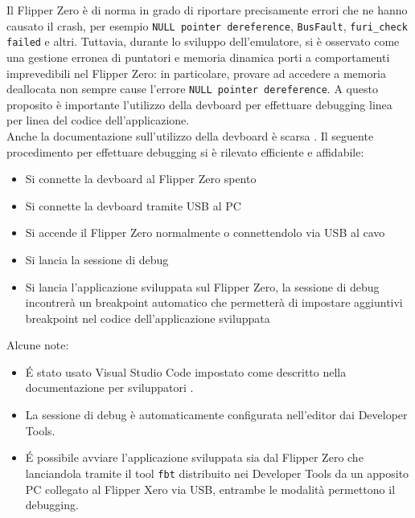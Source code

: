Il Flipper Zero è di norma in grado di riportare precisamente errori che ne hanno causato il crash, per esempio \texttt{NULL pointer dereference}, \texttt{BusFault}, \texttt{furi\_check failed} e altri. Tuttavia, durante lo sviluppo dell'emulatore, si è osservato come una gestione erronea di puntatori e memoria dinamica porti a comportamenti imprevedibili nel Flipper Zero: in particolare, provare ad accedere a memoria deallocata non sempre cause l'errore \texttt{NULL pointer dereference}. A questo proposito è importante l'utilizzo della devboard per effettuare debugging linea per linea del codice dell'applicazione.\\
Anche la documentazione sull'utilizzo della devboard è scarsa \cite{devboard}. Il seguente procedimento per effettuare debugging si è rilevato efficiente e affidabile:
\begin{itemize}
  \item Si connette la devboard al Flipper Zero spento
  \item Si connette la devboard tramite USB al PC
  \item Si accende il Flipper Zero normalmente o connettendolo via USB al cavo
  \item Si lancia la sessione di debug
  \item Si lancia l'applicazione sviluppata sul Flipper Zero, la sessione di debug incontrerà un breakpoint automatico che permetterà di impostare aggiuntivi breakpoint nel codice dell'applicazione sviluppata
\end{itemize}
Alcune note:
\begin{itemize}
  \item É stato usato Visual Studio Code impostato come descritto nella documentazione per sviluppatori \cite{devtools}.
  \item La sessione di debug è automaticamente configurata nell'editor dai Developer Tools.
  \item É possibile avviare l'applicazione sviluppata sia dal Flipper Zero che lanciandola tramite il tool \texttt{fbt} distribuito nei Developer Tools da un apposito PC collegato al Flipper Xero via USB, entrambe le modalità permettono il debugging.
\end{itemize}
